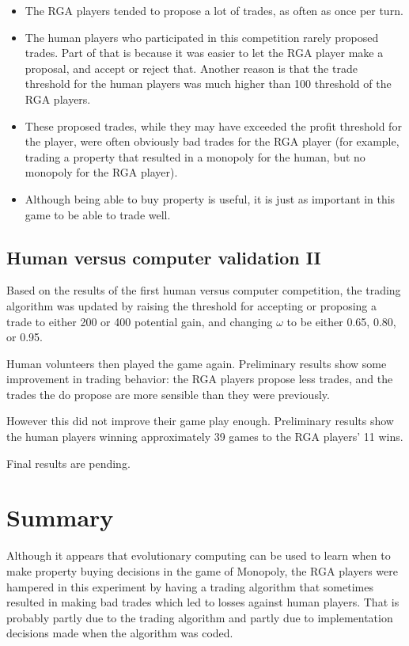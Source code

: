 \begin{itemize}
  \item {The RGA players tended to propose a lot of trades, as often
  as once per turn.}
  \item {The human players who participated in this competition rarely proposed
  trades. Part of that is because it was easier to let the RGA player make a
  proposal, and accept or reject that. Another reason is that the trade
  threshold for the human players was much higher than 100 threshold of the RGA
  players.}
  \item {These proposed trades, while they may have exceeded the profit
  threshold for the player, were often obviously bad trades for the RGA player
  (for example, trading a property that resulted in a monopoly for the human,
  but no monopoly for the RGA player).}
  \item {Although being able to buy property is useful, it is just as important
  in this game to be able to trade well.}
\end{itemize}

 \subsection{Human versus computer validation II} \label{6_humanVRGA2}

 Based on the results of the first human versus computer competition, the trading
 algorithm was updated by raising the threshold for accepting or proposing a trade
 to either 200 or 400 potential gain, and changing \(\omega\) to be either
 0.65, 0.80, or 0.95.

 Human volunteers then played the game again. Preliminary results show some
 improvement in trading behavior: the RGA players propose less trades, and the
 trades the do propose are more sensible than they were previously.

 However this did not improve their game play enough. Preliminary results show
 the human players winning approximately 39 games to the RGA players' 11 wins.

 Final results are pending.

 \section{Summary}

 Although it appears that evolutionary computing can be used to learn when to
 make property buying decisions in the game of Monopoly, the RGA players were
 hampered in this experiment by having a trading algorithm that sometimes
 resulted in making bad trades which led to losses against human players. That
 is probably partly due to the trading algorithm and partly due to
 implementation decisions made when the algorithm was coded.
